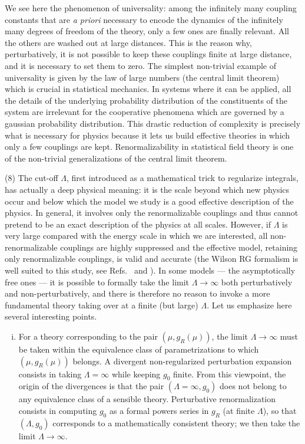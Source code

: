 \documentclass[floatfix,twocolumn,preprintnumbers,amsmath,amssymb,prb]{revtex4}
\begin{document}
{{We see here the phenomenon of universality: among
the infinitely many coupling constants that are {\it a priori}
necessary to encode the dynamics of the infinitely many degrees of
freedom of the theory, only a few ones are finally
relevant.\cite{bagnuls01} All the others are washed out at large
distances. This is the reason why, perturbatively, it is not
possible to keep these couplings finite at large distance, and
it is necessary to set them to zero.\cite{foot12} The simplest
non-trivial example of universality is given by the law of large
numbers (the central limit theorem) which is crucial
in statistical mechanics.\cite{raposo91} In systems where it can
be applied, all the details of the underlying probability
distribution of the constituents of the system are irrelevant for
the cooperative phenomena which are governed by a gaussian
probability distribution.\cite{jona-lasinio00} This drastic
reduction of complexity is precisely what is necessary for physics
because it lets us build effective theories in which only a
few couplings are kept.\cite{lepage89} Renormalizability in
statistical field theory is one of the non-trivial generalizations
of the central limit theorem.

(8) The cut-off $\Lambda$, first introduced as a mathematical
trick to regularize integrals, has actually a deep physical
meaning: it is the scale beyond which new physics occur and below
which the model we study is a good effective description of
the physics. In general, it involves only the renormalizable
couplings and thus cannot pretend to be an exact description of
the physics at all scales. However, if $\Lambda$ is very large
compared with the energy scale in which we are interested, all
non-renormalizable couplings are highly suppressed and the
effective model, retaining only renormalizable couplings, is valid
and accurate (the Wilson RG formalism is well suited to this
study, see Refs.~ and
). In some models --- the asymptotically
free ones --- it is possible to formally take the limit $\Lambda\to\infty$
both perturbatively and non-perturbatively, and there is therefore
no reason to invoke a more fundamental theory taking over at a
finite (but large) $\Lambda$. Let
us emphasize here several interesting points.

\begin{enumerate}[(i)]

\item For a theory corresponding to the pair
$(\mu,g_R(\mu))$, the limit $\Lambda\to\infty$ must be taken
within the equivalence class of parametrizations to which 
$(\mu,g_R(\mu))$
belongs.\cite{nonperb} A
divergent non-regularized perturbation expansion consists in
taking $\Lambda=\infty$ while keeping $g_0$ finite. From this
viewpoint, the origin of the divergences is that the pair
$(\Lambda=\infty,g_0)$ does not belong to any equivalence class of
a sensible theory. Perturbative renormalization consists in
computing $g_0$ as a formal powers series in $g_R$ (at finite
$\Lambda$), so that $(\Lambda,g_0)$ corresponds to a mathematically
consistent theory; we then take the limit $\Lambda\to\infty$.


\end{enumerate}}}
\end{document}
